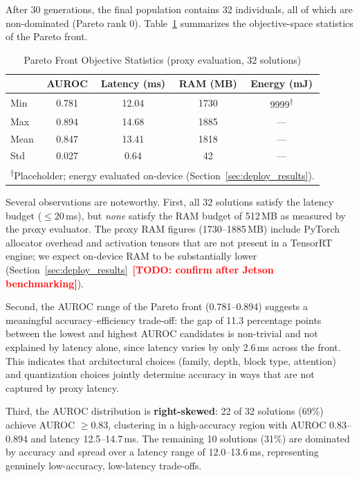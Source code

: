 \documentclass[journal]{IEEEtran}
\newcommand{\TODO}[1]{\textcolor{red}{\textbf{[TODO: #1]}}}
\begin{document}
After 30 generations, the final population contains 32 individuals, all of
which are non-dominated (Pareto rank 0).
Table~\ref{tab:pareto_stats} summarizes the objective-space statistics of
the Pareto front.

\begin{table}[!t]
\caption{Pareto Front Objective Statistics (proxy evaluation, 32 solutions)}
\label{tab:pareto_stats}
\centering
\begin{tabular}{@{}lcccc@{}}
\toprule
 & \textbf{AUROC} & \textbf{Latency (ms)} & \textbf{RAM (MB)} & \textbf{Energy (mJ)} \\
\midrule
Min     & 0.781 & 12.04 & 1730 & 9999\textsuperscript{$\dagger$} \\
Max     & 0.894 & 14.68 & 1885 &    --- \\
Mean    & 0.847 & 13.41 & 1818 &    --- \\
Std     & 0.027 &  0.64 &   42 &    --- \\
\bottomrule
\multicolumn{5}{l}{\textsuperscript{$\dagger$}Placeholder; energy evaluated on-device (Section~\ref{sec:deploy_results}).}
\end{tabular}
\end{table}

\noindent
Several observations are noteworthy.
First, all 32 solutions satisfy the latency budget ($\leq 20$\,ms),
but \emph{none} satisfy the RAM budget of 512\,MB as measured by the proxy
evaluator.
The proxy RAM figures (1730--1885\,MB) include PyTorch allocator overhead and
activation tensors that are not present in a TensorRT engine;
we expect on-device RAM to be substantially lower
(Section~\ref{sec:deploy_results}~\TODO{confirm after Jetson benchmarking}).

Second, the AUROC range of the Pareto front (0.781--0.894) suggests a
meaningful accuracy--efficiency trade-off: the gap of 11.3 percentage points
between the lowest and highest AUROC candidates is non-trivial and not
explained by latency alone, since latency varies by only 2.6\,ms across the
front.
This indicates that architectural choices (family, depth, block type,
attention) and quantization choices jointly determine accuracy in ways that
are not captured by proxy latency.

Third, the AUROC distribution is \textbf{right-skewed}: 22 of 32 solutions
(69\%) achieve AUROC $\geq 0.83$, clustering in a high-accuracy region with
AUROC 0.83--0.894 and latency 12.5--14.7\,ms.
The remaining 10 solutions (31\%) are dominated by accuracy and spread over a
latency range of 12.0--13.6\,ms, representing genuinely low-accuracy, low-latency
trade-offs.
\end{document}
